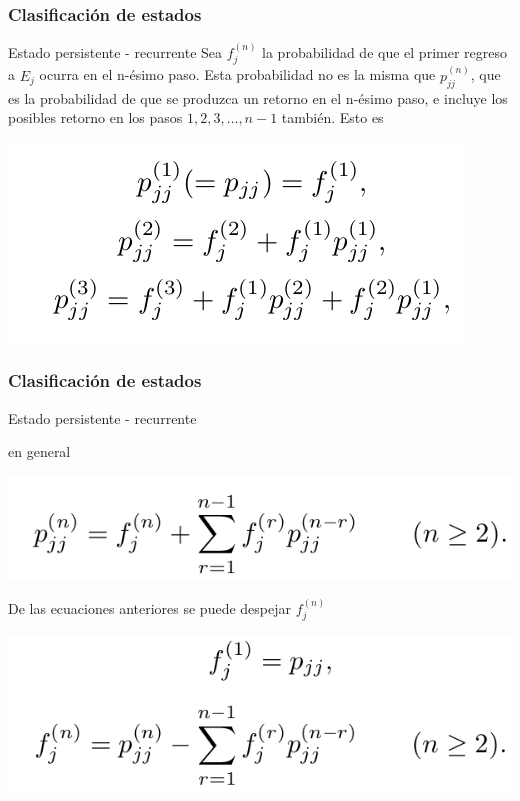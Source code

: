 \documentclass[spanish]{beamer}
\begin{document}
\begin{frame}
\frametitle{Clasificación de estados}
\begin{block}{Estado persistente - recurrente}
Sea $f^{(n)}_{j}$ la probabilidad de que el primer regreso a $E_{j}$ ocurra en el n-ésimo paso. Esta probabilidad no es la misma que $p^{(n)}_{jj}$, que es la probabilidad de que se produzca un retorno en el n-ésimo paso, e incluye los posibles retorno en los pasos $1, 2, 3,\ldots, n - 1$ también. Esto es 

\begin{center}
\includegraphics[scale=0.4]{im33}
\end{center}


\end{block}


\end{frame}

\begin{frame}
\frametitle{Clasificación de estados}
\begin{block}{Estado persistente -  recurrente}

en general
\begin{center}
\includegraphics[scale=0.35]{im34}
\end{center}
De las ecuaciones anteriores se puede despejar $f_{j}^{(n)}$ 
\begin{center}
\includegraphics[scale=0.35]{im35}
\end{center}
\end{block}


\end{frame}
\end{document}
